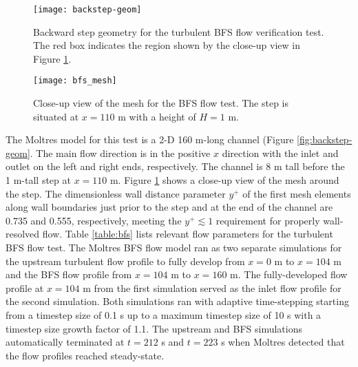 \begin{figure}[p]
  \centering
  \texttt{[image: backstep-geom]}
  \caption{Backward step geometry for the turbulent \gls{BFS} flow verification test. The red box indicates
  the region shown by the close-up view in Figure \ref{fig:bfs-mesh}.}
  \label{fig:backstep-geom}
  \centering
  \texttt{[image: bfs\_mesh]}
  \caption{Close-up view of the mesh for the \gls{BFS} flow test. The step is situated at $x=110$ m
  with a height of $H=1$ m.}
  \label{fig:bfs-mesh}
\end{figure}

The Moltres model for this test is a 2-D 160 m-long channel (Figure \ref{fig:backstep-geom}.
The main flow direction is in the
positive $x$ direction with the inlet and outlet on the left and right ends, respectively. The
channel is 8 m tall before the 1 m-tall step at $x=110$ m. Figure \ref{fig:bfs-mesh} shows a
close-up view of the mesh around the step. The dimensionless wall distance parameter $y^+$ of the
first mesh elements along wall boundaries just prior to the step and at the end of the channel are
0.735 and 0.555, respectively, meeting the $y^+ \lesssim 1$ requirement for properly wall-resolved
flow. Table \ref{table:bfs} lists relevant flow parameters for the turbulent \gls{BFS} flow test.
The Moltres \gls{BFS} flow model ran as two separate simulations for the upstream turbulent flow
profile to fully develop from $x=0$ m to $x=104$ m and the \gls{BFS} flow profile from $x=104$ m to
$x=160$ m. The fully-developed flow profile at $x=104$ m from the first simulation served as the
inlet flow profile for the second simulation. Both simulations ran with adaptive time-stepping
starting from a timestep size of 0.1 s up to a maximum timestep size of 10 s with a timestep size
growth factor of 1.1. The upstream and \gls{BFS} simulations automatically terminated at $t=212$ s
and $t=223$ s when Moltres detected that the flow profiles reached steady-state.

